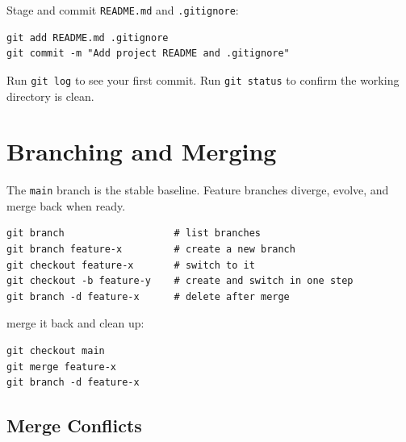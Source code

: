  Stage and commit \texttt{README.md}
and \texttt{.gitignore}:

\begin{verbatim}
git add README.md .gitignore
git commit -m "Add project README and .gitignore"
\end{verbatim}

Run \texttt{git log} to see your first commit. Run \texttt{git status} to confirm the working directory is clean.



\newpage
\section{Branching and Merging}

 The \texttt{main} branch is the stable baseline.
Feature branches diverge, evolve, and merge back when ready.

\begin{verbatim}
git branch                   # list branches
git branch feature-x         # create a new branch
git checkout feature-x       # switch to it
git checkout -b feature-y    # create and switch in one step
git branch -d feature-x      # delete after merge
\end{verbatim}


 merge it back and clean up:

\begin{verbatim}
git checkout main
git merge feature-x
git branch -d feature-x
\end{verbatim}

\subsection{Merge Conflicts}

